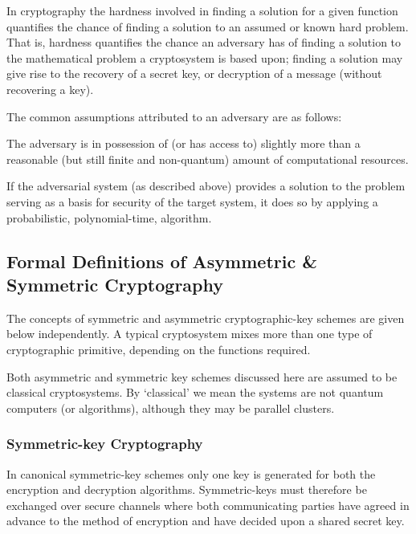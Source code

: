 In cryptography the \gls{hardness} involved in finding a solution for a given function quantifies the chance of finding a solution to an assumed or known hard problem. That is, hardness quantifies the chance an adversary has of finding a solution to the mathematical problem a cryptosystem is based upon; finding a solution may give rise to the recovery of a secret key, or decryption of a message (without recovering a key). 


The common assumptions attributed to an adversary are as follows:

\begin{asu}
	The adversary is in possession of (or has access to) slightly more than a reasonable (but still finite and non-quantum) amount of computational resources.
\end{asu}



\begin{asu}
	If the adversarial system (as described above) provides a solution to the problem serving as a basis for security of the target system, it does so by applying a probabilistic, polynomial-time, algorithm. 
\end{asu}

 

\subsection{Formal Definitions of Asymmetric \& Symmetric Cryptography} 

The concepts of symmetric and asymmetric cryptographic-key schemes are given below independently. A typical cryptosystem mixes more than one type of cryptographic primitive, depending on the functions required. 

Both asymmetric and symmetric key schemes discussed here are assumed to be classical cryptosystems. By `classical' we mean the systems are not quantum computers (or algorithms), although they may be parallel clusters. 



\subsubsection{Symmetric-key Cryptography} 

In canonical symmetric-key schemes only one key is generated for both the encryption and decryption algorithms. Symmetric-keys must therefore be exchanged over secure channels where both communicating parties have agreed in advance to the method of encryption and have decided upon a shared secret key. 


